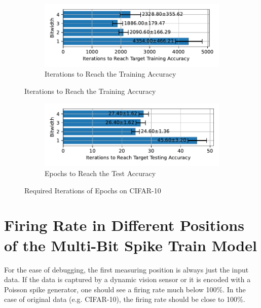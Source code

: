     \label{appendix:iterations_cifar10}
        \begin{figure}[H]
            \centering
            \begin{subfigure}[H]{0.6\textwidth}
                \centering
                \includegraphics[width=\textwidth]{../standard/CIFAR10/plots/cifar10_train_iters_horizontal.pdf}
                \caption{Iterations to Reach the Training Accuracy}
            \end{subfigure}
        \end{figure}
        \begin{figure}[H]
            \centering
            \ContinuedFloat
            \begin{subfigure}[H]{0.6\textwidth}
                \centering
                \includegraphics[width=\textwidth]{../standard/CIFAR10/plots/cifar10_test_iters_horizontal.pdf}
                \caption{Epochs to Reach the Test Accuracy}
            \end{subfigure}
            \caption{Required Iterations of Epochs on CIFAR-10}
        \end{figure}



\chapter{Firing Rate in Different Positions of the Multi-Bit Spike Train Model}
\label{appendix:firerate}

    For the ease of debugging, the first measuring position is always just the input data. If the data is captured by a dynamic vision sensor or it is encoded with a Poisson spike generator, one should see a firing rate much below 100\%. In the case of original data (e.g. CIFAR-10), the firing rate should be close to 100\%. 


